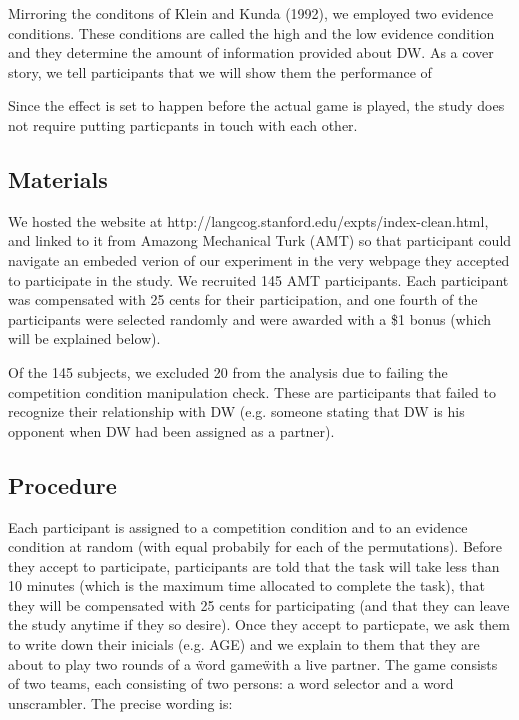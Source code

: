 \documentclass{article} \usepackage{apacite} \usepackage{graphicx} \usepackage{listings}
\begin{document}
Mirroring the conditons of Klein and Kunda (1992), we employed two evidence conditions. These conditions are called the high and the low evidence condition and they determine the amount of information provided about DW. As a cover story, we tell participants that we will show them the performance of

Since the effect is set to happen before the actual game is played, the study does not require putting particpants in touch with each other.

\subsection{Materials}

We hosted the website at http://langcog.stanford.edu/expts/index-clean.html, and linked to it from Amazong Mechanical Turk (AMT) so that participant could navigate an embeded verion of our experiment in the very webpage they accepted to participate in the study. We recruited 145 AMT participants. Each participant was compensated with 25 cents for their participation, and one fourth of the participants were selected randomly and were awarded with a \$1 bonus (which will be explained below).

Of the 145 subjects, we excluded 20 from the analysis due to failing the competition condition manipulation check. These are participants that failed to recognize their relationship with DW (e.g. someone stating that DW is his opponent when DW had been assigned as a partner).


\subsection{Procedure}

Each participant is assigned to a competition condition and to an evidence condition at random (with equal probabily for each of the permutations). Before they accept to participate, participants are told that the task will take less than 10 minutes (which is the maximum time allocated to complete the task), that they will be compensated with 25 cents for participating (and that they can leave the study anytime if they so desire). Once they accept to particpate, we ask them to write down their inicials (e.g. AGE) and we explain to them that they are about to play two rounds of a \"word game\" with a live partner. The game consists of two teams, each consisting of two persons: a word selector and a word unscrambler. The precise wording is:
\end{document}
